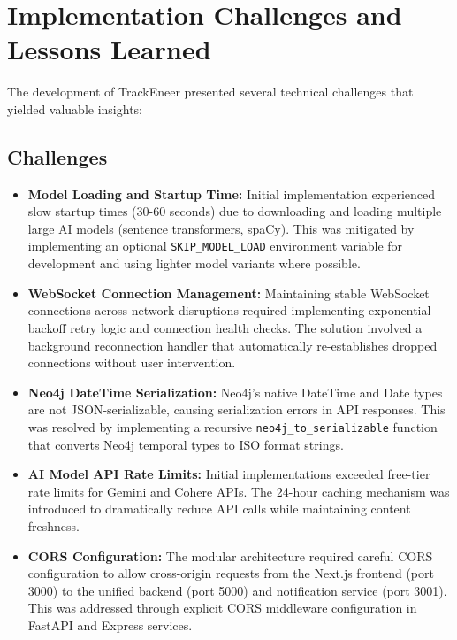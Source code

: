 \documentclass[conference]{IEEEtran}
\begin{document}
\section{Implementation Challenges and Lessons Learned}
The development of TrackEneer presented several technical challenges that yielded valuable insights:

\subsection{Challenges}
\begin{itemize}
    \item \textbf{Model Loading and Startup Time:} Initial implementation experienced slow startup times (30-60 seconds) due to downloading and loading multiple large AI models (sentence transformers, spaCy). This was mitigated by implementing an optional \texttt{SKIP\_MODEL\_LOAD} environment variable for development and using lighter model variants where possible.
    \item \textbf{WebSocket Connection Management:} Maintaining stable WebSocket connections across network disruptions required implementing exponential backoff retry logic and connection health checks. The solution involved a background reconnection handler that automatically re-establishes dropped connections without user intervention.
    \item \textbf{Neo4j DateTime Serialization:} Neo4j's native DateTime and Date types are not JSON-serializable, causing serialization errors in API responses. This was resolved by implementing a recursive \texttt{neo4j\_to\_serializable} function that converts Neo4j temporal types to ISO format strings.
    \item \textbf{AI Model API Rate Limits:} Initial implementations exceeded free-tier rate limits for Gemini and Cohere APIs. The 24-hour caching mechanism was introduced to dramatically reduce API calls while maintaining content freshness.
    \item \textbf{CORS Configuration:} The modular architecture required careful CORS configuration to allow cross-origin requests from the Next.js frontend (port 3000) to the unified backend (port 5000) and notification service (port 3001). This was addressed through explicit CORS middleware configuration in FastAPI and Express services.
\end{itemize}
\end{document}
